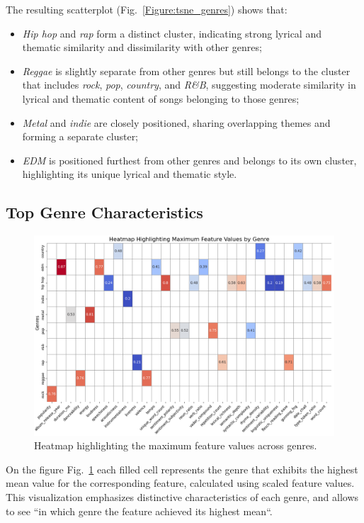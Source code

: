 The resulting scatterplot (Fig.~\ref{Figure:tsne_genres}) shows that:
\begin{itemize}
  \item \textit{Hip hop} and \textit{rap} form a distinct cluster, indicating
    strong lyrical and thematic similarity and dissimilarity with other genres;
  \item \textit{Reggae} is slightly separate from other genres but still
    belongs to the cluster that includes \textit{rock}, \textit{pop},
    \textit{country}, and \textit{R\&B}, suggesting moderate similarity in
    lyrical and thematic content of songs belonging to those genres;
  \item \textit{Metal} and \textit{indie} are closely positioned, sharing
    overlapping themes and forming a  separate cluster;
  \item \textit{EDM} is positioned furthest from other genres and belongs to
    its own cluster, highlighting its unique lyrical and thematic style.
\end{itemize}

\subsection{Top Genre Characteristics}
\begin{center}
\begin{figure}[H]
  \centering
  \includegraphics[width=6in]{img/heatmap_max_feature_values_by_genre.png}
  \caption{Heatmap highlighting the maximum feature values across genres.}
  \label{Figure:heatmap_max_feature_values_by_genre}
\end{figure}
\end{center}
On the figure Fig.~\ref{Figure:heatmap_max_feature_values_by_genre} each filled
cell represents the genre that exhibits the highest mean value for the
corresponding feature, calculated using scaled feature values. This
visualization emphasizes distinctive characteristics of each genre, and allows
to see ``in  which genre the feature achieved its highest mean``.

